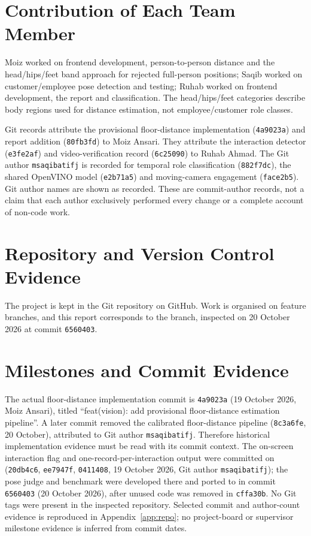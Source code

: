 \section{Contribution of Each Team Member}
Moiz worked on frontend development, person-to-person distance and the head/hips/feet band approach for rejected full-person positions; Saqib worked on customer/employee pose detection and testing; Ruhab worked on frontend development, the report and classification. The head/hips/feet categories describe body regions used for distance estimation, not employee/customer role classes.

Git records attribute the provisional floor-distance implementation (\texttt{4a9023a}) and report addition (\texttt{80fb3fd}) to Moiz Ansari. They attribute the interaction detector (\texttt{e3fe2af}) and video-verification record (\texttt{6c25090}) to Ruhab Ahmad. The Git author \texttt{msaqibatifj} is recorded for temporal role classification (\texttt{882f7dc}), the shared OpenVINO model (\texttt{e2b71a5}) and moving-camera engagement (\texttt{face2b5}). Git author names are shown as recorded. These are commit-author records, not a claim that each author exclusively performed every change or a complete account of non-code work.

\section{Repository and Version Control Evidence}
The project is kept in the Git repository  on GitHub. Work is organised on feature branches, and this report corresponds to the  branch, inspected on 20 October 2026 at commit \texttt{6560403}.

\section{Milestones and Commit Evidence}
The actual floor-distance implementation commit is \texttt{4a9023a} (19 October 2026, Moiz Ansari), titled ``feat(vision): add provisional floor-distance estimation pipeline''. A later commit removed the calibrated floor-distance pipeline (\texttt{8c3a6fe}, 20 October), attributed to Git author \texttt{msaqibatifj}. Therefore historical implementation evidence must be read with its commit context. The on-screen interaction flag and one-record-per-interaction output were committed on  (\texttt{20db4c6}, \texttt{ee7947f}, \texttt{0411408}, 19 October 2026, Git author \texttt{msaqibatifj}); the pose judge and benchmark were developed there and ported to  in commit \texttt{6560403} (20 October 2026), after unused code was removed in \texttt{cffa30b}. No Git tags were present in the inspected repository. Selected commit and author-count evidence is reproduced in Appendix~\ref{app:repo}; no project-board or supervisor milestone evidence is inferred from commit dates.

